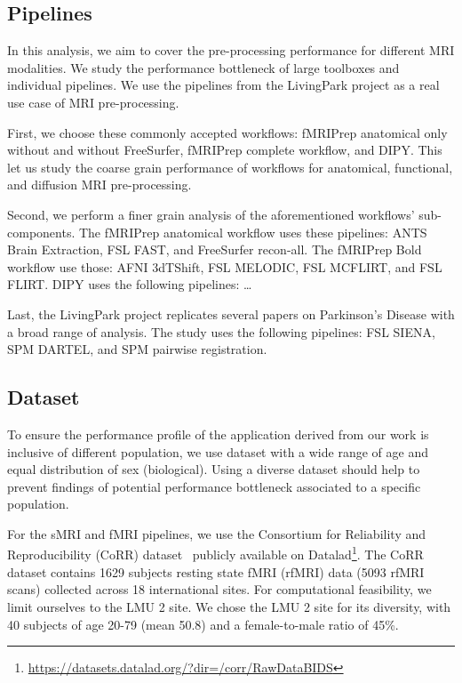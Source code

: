 \documentclass[conference]{IEEEtran}
\begin{document}
\subsection{Pipelines}
In this analysis, we aim to cover the pre-processing performance for different MRI modalities. We study the performance bottleneck of large toolboxes and individual pipelines. We use the pipelines from the LivingPark project as a real use case of MRI pre-processing.

First, we choose these commonly accepted workflows: fMRIPrep anatomical only without and without FreeSurfer, fMRIPrep complete workflow, and DIPY. This let us study the coarse grain performance of workflows for anatomical, functional, and diffusion MRI pre-processing. 

Second, we perform a finer grain analysis of the aforementioned workflows' sub-components. The fMRIPrep anatomical workflow uses these pipelines: ANTS Brain Extraction, FSL FAST, and FreeSurfer recon-all. The fMRIPrep Bold workflow use those: AFNI 3dTShift, FSL MELODIC, FSL MCFLIRT, and FSL FLIRT. DIPY uses the following pipelines: \dots

Last, the LivingPark project replicates several papers on Parkinson's Disease with a broad range of analysis. The study uses the following pipelines: FSL SIENA, SPM DARTEL, and SPM pairwise registration.

\subsection{Dataset}
To ensure the performance profile of the application derived from our work is inclusive of different population, we use dataset with a wide range of age and equal distribution of sex (biological). Using a diverse dataset should help to prevent findings of potential performance bottleneck associated to a specific population.

For the sMRI and fMRI pipelines, we use the Consortium for Reliability and Reproducibility (CoRR) dataset~\cite{Zuo2014-xa} publicly available on Datalad\footnote{\href{https://datasets.datalad.org/?dir=/corr/RawDataBIDS}{https://datasets.datalad.org/?dir=/corr/RawDataBIDS}}. The CoRR dataset contains 1629 subjects resting state fMRI (rfMRI) data (5093 rfMRI scans) collected across 18 international sites. For computational feasibility, we limit ourselves to the LMU 2 site. We chose the LMU 2 site for its diversity, with 40 subjects of age 20-79 (mean 50.8) and a female-to-male ratio of 45\%.
\end{document}
